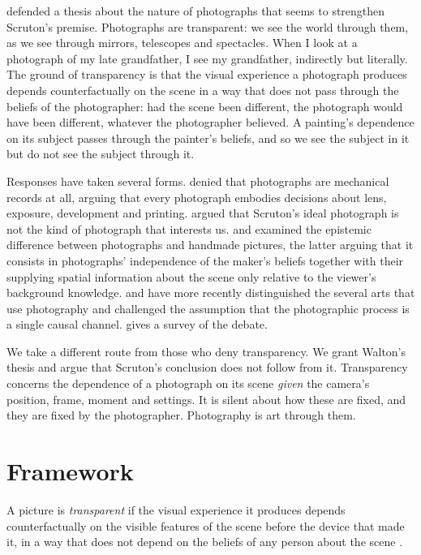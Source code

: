 \documentclass{situationist-preprint}
\begin{document}
\citet{Walton1984} defended a thesis about the nature of photographs that seems to strengthen Scruton's premise. Photographs are transparent: we see the world through them, as we see through mirrors, telescopes and spectacles. When I look at a photograph of my late grandfather, I see my grandfather, indirectly but literally. The ground of transparency is that the visual experience a photograph produces depends counterfactually on the scene in a way that does not pass through the beliefs of the photographer: had the scene been different, the photograph would have been different, whatever the photographer believed. A painting's dependence on its subject passes through the painter's beliefs, and so we see the subject in it but do not see the subject through it.

Responses have taken several forms. \citet{SnyderAllen1975} denied that photographs are mechanical records at all, arguing that every photograph embodies decisions about lens, exposure, development and printing. \citet{King1992} argued that Scruton's ideal photograph is not the kind of photograph that interests us. \citet{Currie1991} and \citet{CohenMeskin2004} examined the epistemic difference between photographs and handmade pictures, the latter arguing that it consists in photographs' independence of the maker's beliefs together with their supplying spatial information about the scene only relative to the viewer's background knowledge. \citet{Lopes2016} and \citet{Costello2018} have more recently distinguished the several arts that use photography and challenged the assumption that the photographic process is a single causal channel. \citet{Friday2002} gives a survey of the debate.

We take a different route from those who deny transparency. We grant Walton's thesis and argue that Scruton's conclusion does not follow from it. Transparency concerns the dependence of a photograph on its scene \emph{given} the camera's position, frame, moment and settings. It is silent about how these are fixed, and they are fixed by the photographer. Photography is art through them.

\section{Framework}

\begin{definition}[Transparency]\label{d:transp}
A picture is \emph{transparent} if the visual experience it produces depends counterfactually on the visible features of the scene before the device that made it, in a way that does not depend on the beliefs of any person about the scene \citep{Walton1984}.
\end{definition}
\end{document}
